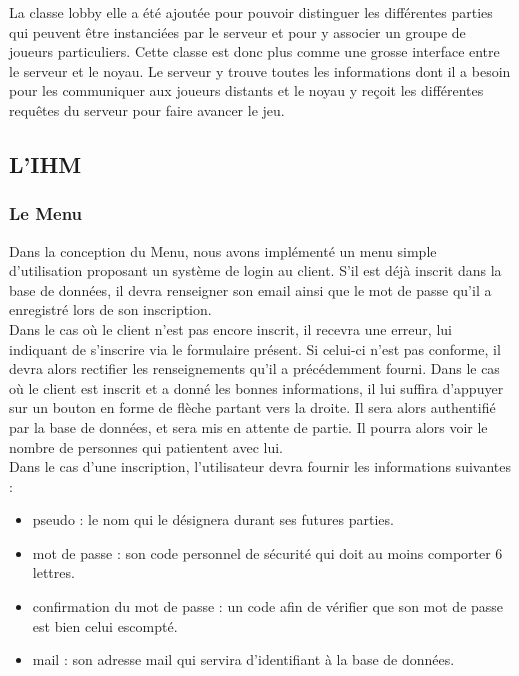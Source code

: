 \documentclass[a4paper,11pt]{article}
\begin{document}
	La classe lobby elle a été ajoutée pour pouvoir distinguer les différentes parties qui peuvent être instanciées par le serveur et pour y associer un groupe de joueurs particuliers. Cette classe est donc plus comme une grosse interface entre le serveur et le noyau. Le serveur y trouve toutes les informations dont il a besoin pour les communiquer aux joueurs distants et le noyau y reçoit les différentes requêtes du serveur pour faire avancer le jeu.  \\
	


\subsection{L'IHM}


\subsubsection{Le Menu}

	Dans la conception du Menu, nous avons implémenté un menu simple d’utilisation
proposant un système de login au client. S’il est déjà inscrit dans la base de données, il devra renseigner son email ainsi que le mot de passe qu’il a enregistré lors de son inscription. \\

Dans le cas où le client n’est pas encore inscrit, il recevra une erreur, lui indiquant de s’inscrire via le formulaire présent. Si celui-ci n’est pas conforme, il devra alors rectifier les renseignements qu’il a précédemment fourni. Dans le cas où le client est inscrit et a donné les bonnes informations, il lui suffira d’appuyer sur un bouton en forme de flèche partant vers la droite. Il sera alors authentifié par la base de données, et sera mis en attente de partie. Il pourra alors voir le nombre de personnes qui patientent avec lui. \\

	Dans le cas d’une inscription, l’utilisateur devra fournir les informations suivantes :

\begin{itemize}
	\item pseudo : le nom qui le désignera durant ses futures parties.
	\item mot de passe : son code personnel de sécurité qui doit au moins comporter 6 lettres.
	\item confirmation du mot de passe : un code afin de vérifier que son mot de passe est bien celui escompté.
	\item mail : son adresse mail qui servira d’identifiant à la base de données. 	 \\
\end{itemize}
\end{document}
